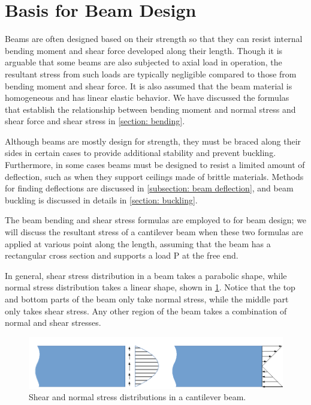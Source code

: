 \documentclass[
10pt,
a4paper,
openany,
svgnames,
]{book}
\begin{document}
\section{Basis for Beam Design}

Beams are often designed based on their strength so that they can resist internal bending moment and shear force developed along their length. Though it is arguable that some beams are also subjected to axial load in operation, the resultant stress from such loads are typically negligible compared to those from bending moment and shear force. It is also assumed that the beam material is homogeneous and has linear elastic behavior. We have discussed the formulas that establish the relationship between bending moment and normal stress and shear force and shear stress in \cref{section: bending}.

Although beams are mostly design for strength, they must be braced along their sides in certain cases to provide additional stability and prevent buckling. Furthermore, in some cases beams must be designed to resist a limited amount of deflection, such as when they support ceilings made of brittle materials. Methods for finding deflections are discussed in \cref{subsection: beam deflection}, and beam buckling is discussed in details in \cref{section: buckling}.

The beam bending and shear stress formulas are employed to for beam design; we will discuss the resultant stress of a cantilever beam when these two formulas are applied at various point along the length, assuming that the beam has a rectangular cross section and supports a load P at the free end.

In general, shear stress distribution in a beam takes a parabolic shape, while normal stress distribution takes a linear shape, shown in \cref{fig: stress in beam}. Notice that the top and bottom parts of the beam only take normal stress, while the middle part only takes shear stress. Any other region of the beam takes a combination of normal and shear stresses.

\begin{figure}[h]
  \centering
  \includegraphics[scale=1]{pictures/Simple-load-bearing/stress-in-beam}
  \caption{Shear and normal stress distributions in a cantilever beam.}
  \label{fig: stress in beam}
\end{figure}
\end{document}
